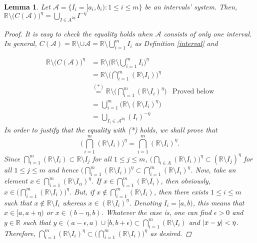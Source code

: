 \documentclass[a4paper,12pt]{article}
\newtheorem{lemma}{Lemma}[section]
\DeclarePairedDelimiter{\abs}{\lvert}{\rvert}
\begin{document}
\begin{lemma} Let $\mathcal{A}=\{I_i=[a_i,b_i):  1\leq i \leq m\}$ be an intervals' system. Then, $\displaystyle \mathbb{R}\setminus \big(C(\mathcal{A})\big)^\eta=\bigcup_{I\in A^{2\eta}} I^{-\eta}$

\begin{proof}
It is easy to check the equality holds when $\mathcal{A}$ consists of only one interval. In general, $C(\mathcal{A})=\mathbb{R}\setminus \cup \mathcal{A}=\mathbb{R} \setminus \bigcup_{i=1}^m I_i$ as Definition \ref{interval} and

\begin{align*}
\mathbb{R}\setminus \big(C(\mathcal{A})\big)^\eta&=\mathbb{R}\setminus\big(\mathbb{R} \setminus \bigcup_{i=1}^m I_i \big)^\eta 
\\&=\mathbb{R}\setminus \big(\bigcap_{i=1}^m(\mathbb{R} \setminus I_i)\big)^\eta
\\&\stackrel{(*)}{=}\mathbb{R}\setminus \big(\bigcap_{i=1}^m(\mathbb{R}\setminus I_i)^\eta \big)&\mbox{Proved below}
\\&= \bigcup_{i=1}^m\big(\mathbb{R}\setminus (\mathbb{R}\setminus I_i)^\eta\big)
\\&=\bigcup_{I_i \in \mathcal{A}^{2\eta}} (I_i)^{-\eta}
\end{align*}
In order to justify that the equality with  (*) holds, we shall prove that $$\big(\bigcap_{i=1}^m(\mathbb{R} \setminus I_i)\big)^\eta=\bigcap_{i=1}^m(\mathbb{R}\setminus I_i)^\eta.$$
Since $\bigcap_{i=1}^m(\mathbb{R} \setminus I_i)\subset \mathbb{R}\setminus I_j$ for all $1\leq j \leq m$, $\big(\bigcap_{i \in A}(\mathbb{R} \setminus I_i)\big)^\eta \subset (\mathbb{R}\setminus I_j)^\eta$ for all $1\leq j \leq m$ and hence $\big(\bigcap_{i=1}^m(\mathbb{R} \setminus I_i)\big)^\eta\subset \bigcap_{i=1}^m(\mathbb{R}\setminus I_i)^\eta$. Now, take an element $x\in \bigcap_{i=1}^m(\mathbb{R}\setminus I_\alpha)^\eta$. If $x\in \bigcap_{i=1}^m(\mathbb{R}\setminus I_i)$, then obviously, $x\in \big(\bigcap_{i=1}^m(\mathbb{R} \setminus I_i)\big)^\eta$.
But, if $x\notin \bigcap_{i=1}^m(\mathbb{R}\setminus I_i)$, then there exists $1\leq i\leq m$ such that $x\notin \mathbb{R}\setminus I_i$ whereas $x\in (\mathbb{R}\setminus I_i)^\eta$. Denoting $I_i=[a,b)$, this means that $x\in [a, a+\eta)$ or $x\in (b-\eta,b)$. Whatever the case is, one can find  $\epsilon>0$ and $y\in \mathbb{R}$ such that $y\in (a-\epsilon, a)\cup [b,b+\epsilon) \subset \bigcap_{i=1}^m(\mathbb{R} \setminus I_i)$ and $\abs{x-y}<\eta$. Therefore, $\bigcap_{i=1}^m(\mathbb{R}\setminus I_i)^\eta \subset \big(\bigcap_{i=1}^m(\mathbb{R} \setminus I_i)\big)^\eta$ as desired.
\end{proof}
\end{lemma}
\end{document}
